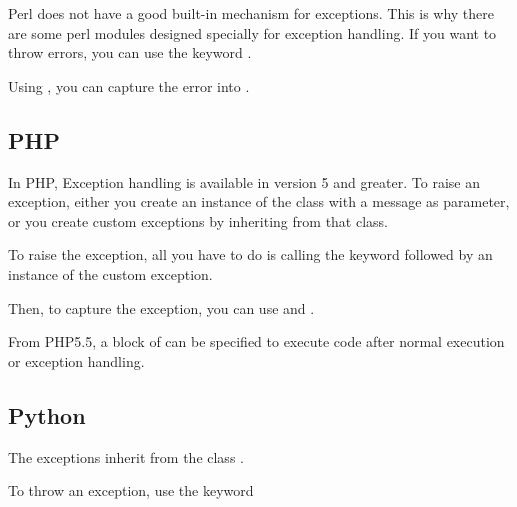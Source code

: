 \documentclass{KodeBook}
\begin{document}
Perl does not have a good built-in mechanism for exceptions. 
This is why there are some perl modules designed specially for exception handling.
If you want to throw errors, you can use the keyword . 



Using , you can capture the error into .



\subsection{PHP}

In PHP, Exception handling is available in version 5 and greater.
To raise an exception, either you create an instance of the class  with a message as parameter, 
or you create custom exceptions by inheriting from that class.



To raise the exception, all you have to do is calling the keyword  followed by an instance of the custom exception.



Then, to capture the exception, you can use  and .



From PHP5.5, a block of  can be specified to execute code after normal execution or exception handling.

\subsection{Python}

The exceptions inherit from the class .



To throw an exception, use the keyword 


\end{document}
